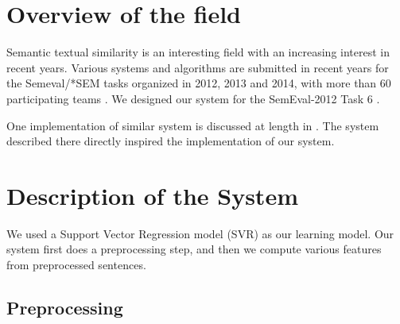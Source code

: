 \documentclass[10pt, a4paper]{article}
\begin{document}
\section{Overview of the field}


Semantic textual similarity is an interesting field with an increasing interest in recent years. Various systems and algorithms are submitted in recent years for the Semeval/*SEM tasks organized in 2012, 2013 and 2014, with more than 60 participating teams \citep{semeval_web}. We designed our system for the SemEval-2012 Task 6 \citep{agirre2012semeval}.

One implementation of similar system is discussed at length in \citep{vsaric2012takelab}. The system described there directly inspired the implementation of our system.

\section{Description of the System}

We used a Support Vector Regression model (SVR) as our learning model. Our system first does a preprocessing step, and then we compute various features from preprocessed sentences.

\subsection{Preprocessing}
\label{sec:first}
\end{document}
